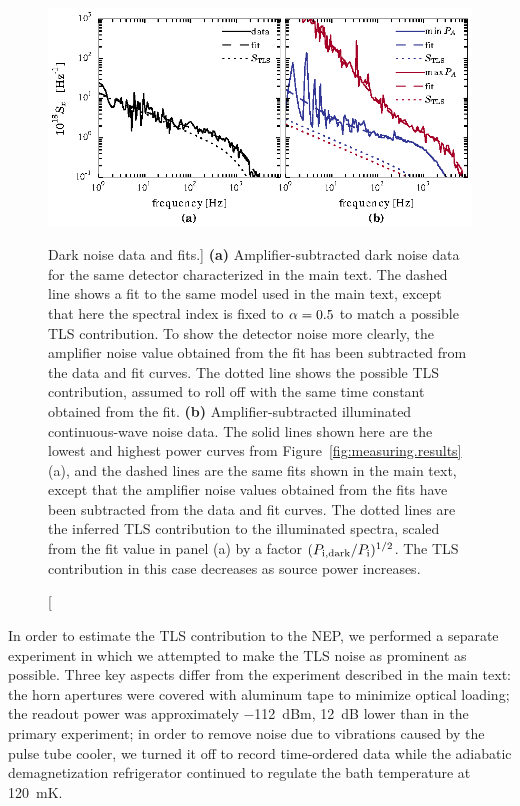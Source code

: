 \begin{figure}[htb]
\includegraphics[width=\columnwidth]{sensitivity/dark_and_light_noise_minus_amp_two_panel.eps}
\caption
[Dark noise data and fits.]
{
\textbf{(a)}
Amplifier-subtracted dark noise data for the same detector characterized in the main text.
The dashed line shows a fit to the same model used in the main text, except that here the spectral index is fixed to $\alpha = 0.5$ to match a possible TLS contribution.
To show the detector noise more clearly, the amplifier noise value obtained from the fit has been subtracted from the data and fit curves.
The dotted line shows the possible TLS contribution, assumed to roll off with the same time constant obtained from the fit.
\textbf{(b)}
Amplifier-subtracted illuminated continuous-wave noise data.
The solid lines shown here are the lowest and highest power curves from Figure~\ref{fig:measuring.results}(a), and the dashed lines are the same fits shown in the main text, except that the amplifier noise values obtained from the fits have been subtracted from the data and fit curves.
The dotted lines are the inferred TLS contribution to the illuminated spectra, scaled from the fit value in panel (a) by a factor $(P_{\mathrm{i}, \mathrm{dark}} / P_{\mathrm{i}})^{1/2}$.
The TLS contribution in this case decreases as source power increases.}
\label{fig:measuring.dark_noise}
\end{figure}

In order to estimate the TLS contribution to the NEP, we performed a separate experiment in which we attempted to make the TLS noise as prominent as possible.
Three key aspects differ from the experiment described in the main text: the horn apertures were covered with aluminum tape to minimize optical loading; the readout power was approximately \SI{-112}{dBm}, \SI{12}{dB} lower than in the primary experiment; in order to remove noise due to vibrations caused by the pulse tube cooler, we turned it off to record time-ordered data while the adiabatic demagnetization refrigerator continued to regulate the bath temperature at \SI{120}{mK}.

